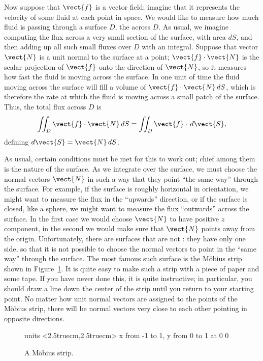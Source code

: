 Now suppose that $\vect{f}$ is a vector field; imagine that it
represents the velocity of some fluid at each point in space. We would
like to measure how much fluid is passing through a surface $D$, the
 across $D$. As usual, we imagine computing
the flux across a very small section of the surface, with area $dS$,
and then adding up all such small fluxes over $D$ with an
integral. Suppose that vector $\vect{N}$ is a unit normal to the surface
at a point; $\vect{f}\cdot\vect{N}$ is the scalar projection of $\vect{f}$
onto the direction of $\vect{N}$, so it measures how fast the fluid is
moving across the surface. In one unit of time the fluid moving across
the surface will fill a volume of $\vect{f}\cdot\vect{N}\,dS$, which is
therefore the rate at which the fluid is moving across a small patch
of the surface. Thus, the total flux across $D$ is
$$\iint_{D} \vect{f}\cdot\vect{N}\,dS=\iint_{D} \vect{f}\cdot\,d\vect{S},$$
defining $d\vect{S}=\vect{N}\,dS$.

As usual, certain conditions must be met for this to work out; chief
among them is the nature of the surface. As we integrate over the
surface, we must choose the normal vectors $\vect{N}$ in such a way that
they point ``the same way'' through the surface. For example, if the
surface is roughly horizontal in orientation, we might want to measure
the flux in the ``upwards'' direction, or if the surface is closed,
like a sphere, we might want to measure the flux ``outwards'' across
the surface. In the first case we would choose $\vect{N}$ to have
positive $z$ component, in the second we would make sure that $\vect{N}$
points away from the origin. Unfortunately, there are surfaces that
are not : they have
only one side, so that it is not possible to choose the normal vectors
to point in the ``same way'' through the surface. The most famous such
surface is the M\"obius strip shown in Figure~\ref{fig:moebius}. It
is quite easy to make such a strip with a piece of paper and some
tape. If you have never done this, it is quite instructive; in
particular, you should draw a line down the center of the strip until
you return to your starting point. No matter how unit normal vectors
are assigned to the points of the M\"obius strip, there will be normal
vectors very close to each other pointing in opposite directions.

\begin{figure}[H]
\centerline{
\vbox{\beginpicture
\normalgraphs
\setcoordinatesystem units <2.5truecm,2.5truecm>
\setplotarea x from -1 to 1, y from 0 to 1
 at 0 0
\endpicture}}
\caption{A M\"obius strip. \label{fig:moebius}}
\end{figure}

